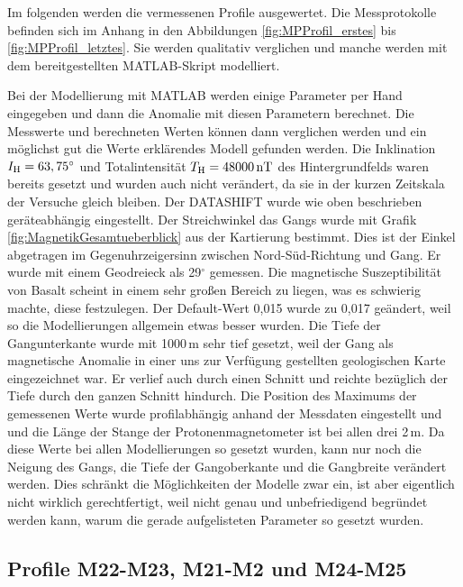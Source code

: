 Im folgenden werden die vermessenen Profile ausgewertet. Die Messprotokolle befinden sich im Anhang in den Abbildungen \ref{fig:MPProfil_erstes} bis \ref{fig:MPProfil_letztes}. Sie werden qualitativ verglichen und manche werden mit dem bereitgestellten MATLAB-Skript modelliert.

Bei der Modellierung mit MATLAB werden einige Parameter per Hand eingegeben und dann die Anomalie mit diesen Parametern berechnet. Die Messwerte und berechneten Werten können dann verglichen werden und ein möglichst gut die Werte erklärendes Modell gefunden werden. Die Inklination $I_{\mathrm{H}}=63,75^\circ$ und Totalintensität $T_{\mathrm{H}}=48000\,\mathrm{nT}$ des Hintergrundfelds waren bereits gesetzt und wurden auch nicht verändert, da sie in der kurzen Zeitskala der Versuche gleich bleiben. Der DATASHIFT wurde wie oben beschrieben geräteabhängig eingestellt. Der Streichwinkel das Gangs wurde mit Grafik \ref{fig:MagnetikGesamtueberblick} aus der Kartierung bestimmt. Dies ist der Einkel abgetragen im Gegenuhrzeigersinn zwischen Nord-Süd-Richtung und Gang. Er wurde mit einem Geodreieck als 29$^\circ$ gemessen. Die magnetische Suszeptibilität von Basalt scheint in einem sehr großen Bereich zu liegen, was es schwierig machte, diese festzulegen. Der Default-Wert 0,015 wurde zu 0,017 geändert, weil so die Modellierungen allgemein etwas besser wurden. Die Tiefe der Gangunterkante wurde mit 1000\,m sehr tief gesetzt, weil der Gang als magnetische Anomalie in einer uns zur Verfügung gestellten geologischen Karte eingezeichnet war. Er verlief auch durch einen Schnitt und reichte bezüglich der Tiefe durch den ganzen Schnitt hindurch. Die Position des Maximums der gemessenen Werte wurde profilabhängig anhand der Messdaten eingestellt und und die Länge der Stange der Protonenmagnetometer ist bei allen drei 2\,m. Da diese Werte bei allen Modellierungen so gesetzt wurden, kann nur noch die Neigung des Gangs, die Tiefe der Gangoberkante und die Gangbreite verändert werden.
Dies schränkt die Möglichkeiten der Modelle zwar ein, ist aber eigentlich nicht wirklich gerechtfertigt, weil nicht genau und unbefriedigend begründet werden kann, warum die gerade aufgelisteten Parameter so gesetzt wurden.


\subsection{Profile M22-M23, M21-M2 und M24-M25}


